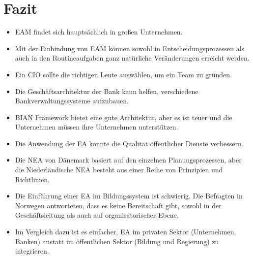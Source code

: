 \documentclass[doc]{apa6}
\begin{document}
\section{Fazit}
\begin{itemize}
\item EAM findet sich hauptsächlich in großen Unternehmen.
\item Mit der Einbindung von EAM können sowohl in Entscheidungsprozessen als auch in den Routineaufgaben ganz natürliche Veränderungen erreicht werden.
\item Ein CIO sollte die richtigen Leute auswählen, um ein Team zu gründen.
\item Die Geschäftsarchitektur der Bank kann helfen, verschiedene Bankverwaltungssysteme aufzubauen.
\item BIAN Framework bietet eine gute Architektur, aber es ist teuer und die Unternehmen müssen ihre Unternehmen unterstützen.
\item Die Anwendung der EA könnte die Qualität öffentlicher Dienste verbessern. \item Die NEA von Dänemark basiert auf den einzelnen Planungsprozessen, aber die Niederländische NEA besteht aus einer Reihe von Prinzipien und Richtlinien.
\item Die Einführung einer EA im Bildungssystem ist schwierig. Die Befragten in Norwegen antworteten, dass es keine Bereitschaft gibt, sowohl in der Geschäftsleitung als auch auf organisatorischer Ebene.
\item Im Vergleich dazu ist es einfacher, EA im privaten Sektor (Unternehmen, Banken) anstatt im öffentlichen Sektor (Bildung und Regierung) zu integrieren.
\end{itemize}

\printbibliography
\end{document}
